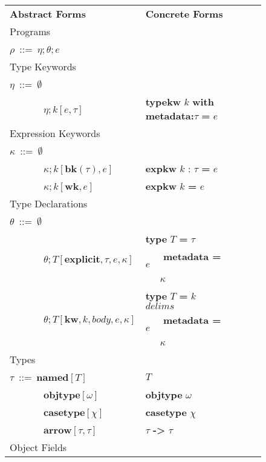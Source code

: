 \documentclass{sig-alternate}
\makeatletter
\newcommand\BeraMonottfamily{%
  \def\fvm@Scale{0.85}%
  \fontfamily{fvm}\selectfont%
}
\newcommand{\textcd}[1]{\textbf{\scriptsize\BeraMonottfamily{#1}}}
\newcommand{\tabularspace}{~~~~~~~}
\makeatother
\begin{document}
\begin{figure}[ht]
\hspace{-5px}\begin{tabular}{ l l l l l }
 \multicolumn{1}{l}{\textbf{Abstract Forms}} & \multicolumn{1}{l}{\textbf{Concrete Forms}}\\
 \multicolumn{3}{l}{Programs}\\
$\rho$~::=~$\eta;\theta;e$\\
\multicolumn{3}{l}{Type Keywords}\\
$\eta$~::=~$\emptyset$\\
\tabularspace$\eta;k[e,\tau]$ & \textcd{typekw} $k$ \textcd{with metadata:}$\tau$ \textcd{=} $e$ \\
\multicolumn{3}{l}{Expression Keywords}\\
$\kappa$~::=~$\emptyset$                        & \\
\tabularspace$\kappa;k[\mathbf{bk}(\tau),e]$    & \textcd{expkw} $k$ : $\tau$ \textcd{=} $e$\\
\tabularspace$\kappa;k[\mathbf{wk},e]$          & \textcd{expkw} $k$ \textcd{=} $e$\\
\multicolumn{3}{l}{Type Declarations}\\
$\theta$~::=~$\emptyset$                        & \\
\multirow{ 3}{*}{\tabularspace$\theta; T[\mathbf{explicit},\tau, e, \kappa]$ }   & \textcd{type} $T$ \textcd{=} $\tau$\\
\tabularspace&~~~\textcd{metadata = }$e$\\
\tabularspace&~~~$\kappa$\\
\multirow{3}{*}{\tabularspace$\theta; T[\mathbf{kw},k, body, e, \kappa]$}  & \textcd{type} $T$ \textcd{=} $k$ $delims$\\
                                                          & ~~~\textcd{metadata = }$e$\\
                                                          & ~~~$\kappa$\\
\multicolumn{3}{l}{Types}\\
$\tau$~::=~$\mathbf{named}[T]$              & $T$\\
\tabularspace$\mathbf{objtype}[\omega]$       & \textcd{objtype} $\omega$ \\
\tabularspace$\mathbf{casetype}[\chi]$        & \textcd{casetype} $\chi$\\
\tabularspace$\mathbf{arrow}[\tau, \tau]$     & $\tau$ \textcd{->} $\tau$\\
\multicolumn{3}{l}{Object Fields}\\       

\end{tabular}
\end{figure}
\end{document}
